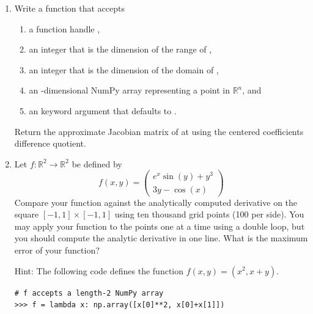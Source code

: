 \begin{problem}
\leavevmode
\begin{enumerate}
\item Write a function that accepts 
\begin{enumerate}
\item a function handle ,
\item an integer that is the dimension of the range of ,
\item an integer  that is the dimension of the domain of ,
\item an -dimensional NumPy array  representing a point in $\mathbb{R}^n$, and
\item an keyword argument  that defaults to .
\end{enumerate}
Return the approximate Jacobian matrix of  at  using the centered coefficients difference quotient.

\item Let $f: \mathbb{R}^2 \to \mathbb{R}^2$ be defined by
\begin{equation*}
f(x, y) =
\begin{pmatrix}
e^{x} \sin(y) + y^3 \\
3y - \cos(x)
\end{pmatrix}
\end{equation*}
Compare your function against the analytically computed derivative on the square $[-1,1] \times [-1,1]$ using ten thousand grid points (100 per side).
You may apply your function to the points one at a time using a double  loop, but you should compute the analytic derivative in one line.
What is the maximum error of your function?

Hint: The following code defines the function $f(x,y) = (x^2, x+y)$.
\begin{lstlisting}
# f accepts a length-2 NumPy array
>>> f = lambda x: np.array([x[0]**2, x[0]+x[1]])
\end{lstlisting}
\end{enumerate}
\end{problem}

